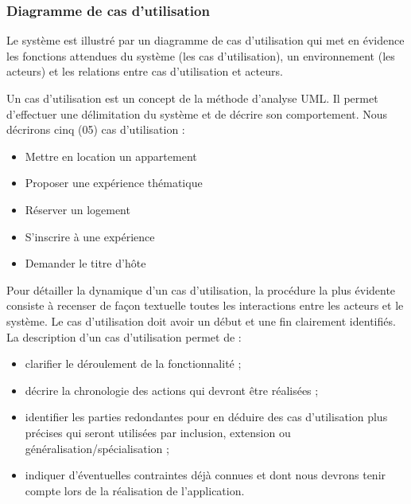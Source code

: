 \subsubsection{Diagramme de cas d’utilisation} 
Le système est illustré par un diagramme de cas d’utilisation qui met en évidence les fonctions attendues du système (les cas d’utilisation), un environnement (les acteurs) et les relations entre cas d’utilisation et acteurs.

Un cas d’utilisation est un concept de la méthode d’analyse UML. Il permet d’effectuer une délimitation du système et de décrire son comportement. Nous décrirons cinq (05) cas d’utilisation :
\begin{itemize}
\item[\textbullet] Mettre en location un appartement
\item[\textbullet] Proposer une expérience thématique
\item[\textbullet] Réserver un logement
\item[\textbullet] S’inscrire à une expérience
\item[\textbullet] Demander le titre d’hôte
\end{itemize}

Pour détailler la dynamique d'un cas d’utilisation, la procédure la plus évidente consiste à recenser de façon textuelle toutes les interactions entre les acteurs et le système. Le cas d’utilisation doit avoir un début et une fin clairement identifiés. La description d’un cas d’utilisation permet de :
\begin{itemize}
\item[\textbullet] clarifier le déroulement de la fonctionnalité ;
\item[\textbullet] décrire la chronologie des actions qui devront être réalisées ;
\item[\textbullet] identifier les parties redondantes pour en déduire des cas d’utilisation plus précises qui seront utilisées par inclusion, extension ou généralisation/spécialisation ;
\item[\textbullet] indiquer d’éventuelles contraintes déjà connues et dont nous devrons tenir compte lors de la réalisation de l'application.
\end{itemize}

\newpage

